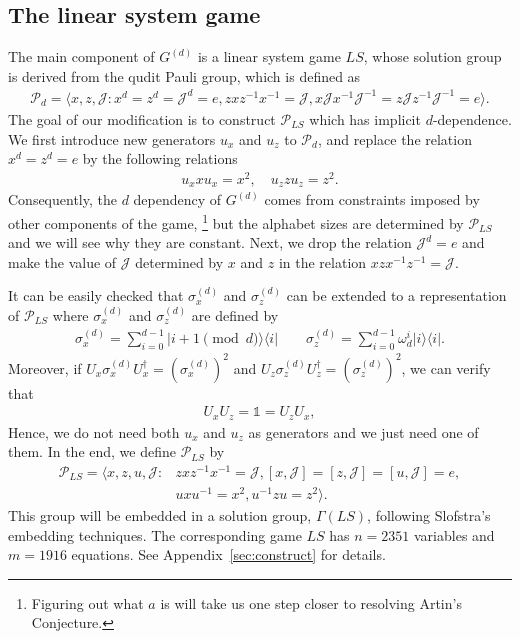 \documentclass[11pt,letterpaper]{article}
\newcommand{\ketbra}[2]{|#1\rangle\langle#2|}
\newcommand{\1}{\mathbb{1}}
\newcommand{\Pg}{\mathcal{P}}
\newcommand{\J}{\mathcal{J}}
\newcommand{\paulix}[1]{\sigma_x^{(#1)}}
\newcommand{\pauliz}[1]{\sigma_z^{(#1)}}
\newcommand{\G}[1]{G^{(#1)}}
\newcommand{\LS}{LS}
\theoremstyle{definition}
\begin{document}
\subsection{The linear system game}
The main component of $\G{d}$ is a linear system game $\LS$, whose solution group is derived from the qudit Pauli group,
which is defined as
\begin{align}
	\Pg_d = \langle x, z, \J : x^d = z^d = \J^d = e, zxz^{-1}x^{-1} = \J, x\J x^{-1}\J^{-1}= z\J z^{-1}\J^{-1} = e\rangle. 
\end{align}
The goal of our modification is to construct $\Pg_{\LS}$ which has implicit $d$-dependence.
We first introduce new generators $u_x$ and $u_z$ to $\Pg_d$, and replace the relation $x^d = z^d = e$ 
by the following relations
\begin{align}
\label{eq:sim}
	u_x x u_x = x^2, \quad
	u_z z u_z = z^2.
\end{align}
Consequently, the $d$ dependency of $\G{d}$ comes from constraints imposed by other components of the game,
\footnote{Figuring out what $a$ is will take us one step closer to resolving Artin's Conjecture\cite{murty1988}.}
but the alphabet sizes are determined by $\Pg_{\LS}$ and we will see why they are constant.
Next, we drop the relation $\J^d = e$ and make the value of $\J$ determined by $x$ and $z$ in the 
relation $xzx^{-1}z^{-1} = \J$.

It can be easily checked that $\paulix{d}$ and $\pauliz{d}$ can be extended to a representation of $\Pg_{\LS}$ 
where  $\paulix{d}$ and $\pauliz{d}$ are defined by
\begin{align}
	\paulix{d} = \sum_{i=0}^{d-1} \ketbra{i+1 \pmod{d} }{i}  \quad \quad
	\pauliz{d} = \sum_{i=0}^{d-1} \omega_d^i \ketbra{i}{i}.
\end{align}
Moreover, if $U_x\paulix{d}U_x^\dagger = (\paulix{d})^2$ and $U_z\pauliz{d}U_z^\dagger = (\pauliz{d})^2$,
we can verify that 
\begin{align}
	U_xU_z = \1 = U_zU_x,
\end{align}
Hence, we do not need both $u_x$ and $u_z$ as generators and we just need one of them.
In the end, we define $\Pg_{\LS}$ by
\begin{equation}
\begin{aligned}
	\Pg_{\LS} =  \langle x, z, u, \J :  &zxz^{-1}x^{-1} = \J, [x,\J]=[z,\J]=[u,\J] = e, \\
	&uxu^{-1} = x^2, u^{-1}zu = z^2 \rangle. 
\end{aligned}
\end{equation}
This group will be embedded in a solution group, $\Gamma(\LS)$, following Slofstra's embedding techniques.
The corresponding game $\LS$ has $n = 2351$ variables and $m= 1916$ equations.
See Appendix~\ref{sec:construct} for details.
\end{document}
